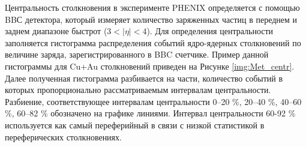 Центральность столкновения в эксперименте PHENIX определяется с помощью BBС детектора, который измеряет количество заряженных частиц в переднем и заднем диапазоне быстрот ($3<|\eta|<4$). 
Для определения центральности заполняется гистограмма распределения событий ядро-ядерных столкновений по величине заряда, зарегистрированного в BBC счетчике. Пример данной гистограммы для Cu+Au столкновений приведен на Рисунке \ref{img:Met_centr}. Далее полученная гистограмма разбивается на части, количество событий в которых пропорционально рассматриваемым интервалам центральности. Разбиение, соответствующее интервалам центральности 0–20 \%, 20–40 \%, 40–60 \%, 60–82 \% обозначено на графике линиями. Интервал центральности 60-92 \% используется как самый переферийный в связи с низкой статистикой в переферических столкновениях.



